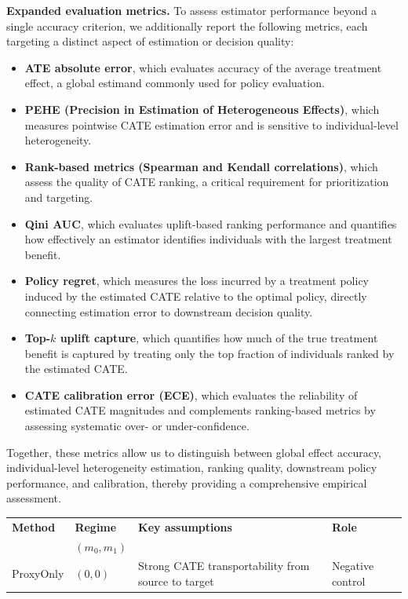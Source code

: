 {\medskip
\noindent
\textbf{Expanded evaluation metrics.}
To assess estimator performance beyond a single accuracy criterion, we additionally report the following metrics, each targeting a distinct aspect of estimation or decision quality:

\begin{itemize}
\item \textbf{ATE absolute error}, which evaluates accuracy of the average treatment effect, a global estimand commonly used for policy evaluation.
\item \textbf{PEHE (Precision in Estimation of Heterogeneous Effects)}, which measures pointwise CATE estimation error and is sensitive to individual-level heterogeneity.
\item \textbf{Rank-based metrics (Spearman and Kendall correlations)}, which assess the quality of CATE ranking, a critical requirement for prioritization and targeting.
\item \textbf{Qini AUC}, which evaluates uplift-based ranking performance and quantifies how effectively an estimator identifies individuals with the largest treatment benefit.
\item \textbf{Policy regret}, which measures the loss incurred by a treatment policy induced by the estimated CATE relative to the optimal policy, directly connecting estimation error to downstream decision quality.
\item \textbf{Top-$k$ uplift capture}, which quantifies how much of the true treatment benefit is captured by treating only the top fraction of individuals ranked by the estimated CATE.
\item \textbf{CATE calibration error (ECE)}, which evaluates the reliability of estimated CATE magnitudes and complements ranking-based metrics by assessing systematic over- or under-confidence.
\end{itemize}

Together, these metrics allow us to distinguish between global effect accuracy, individual-level heterogeneity estimation, ranking quality, downstream policy performance, and calibration, thereby providing a comprehensive empirical assessment.


{\color{blue}
\begin{table}[t]
\centering
\small
\setlength{\tabcolsep}{5pt}
\renewcommand{\arraystretch}{1.20}
\begin{tabular}{p{2.8cm} p{2.4cm} p{5.5cm} p{2.8cm}}
\hline
\textbf{Method} &
\textbf{Regime} &
\textbf{Key assumptions} &
\textbf{Role} \\
&
\textbf{$(m_0,m_1)$} &
&
\\
\hline
ProxyOnly
& $(0,0)$
& Strong CATE transportability from source to target
& Negative control
\\


\end{tabular}
\end{table}}}
